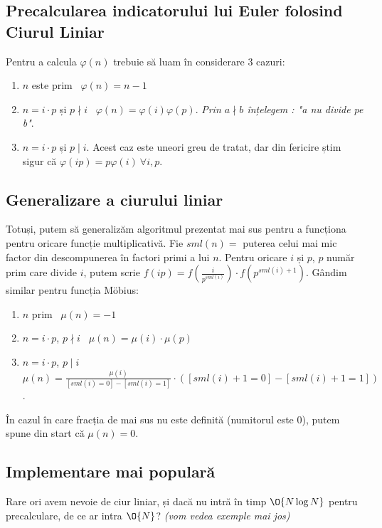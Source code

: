 \subsection{Precalcularea indicatorului lui Euler folosind Ciurul Liniar}
Pentru a calcula $\varphi(n)$ trebuie să luam în considerare $3$ cazuri:
\begin{enumerate}
    \item $n$ este prim \Rightarrow~$\varphi(n) = n-1$
    \item $n = i \cdot p$ și $p \nmid i$ \Rightarrow~$\varphi(n) = \varphi(i) \varphi(p)$. \textit{Prin $a \nmid b$ înțelegem : "a nu divide pe b"}.
    \item $n = i \cdot p$ și $p \mid i$. Acest caz este uneori greu de tratat, dar din fericire știm sigur că $\varphi(ip) = p\varphi(i)\ \forall i, p$.
\end{enumerate}
\subsection{Generalizare a ciurului liniar}
Totuși, putem să generalizăm algoritmul prezentat mai sus pentru a funcționa pentru oricare funcție multiplicativă.
Fie $sml(n) = $ puterea celui mai mic factor din descompunerea în factori primi a lui $n$. Pentru oricare $i$ și $p$, $p$ număr prim care divide $i$, putem scrie $f(ip) = f(\frac{i}{p^{sml(i)}}) \cdot f(p^{sml(i) + 1})$.
Gândim similar pentru funcția Möbius: 
\begin{enumerate}
    \item $n$ prim \Rightarrow~$\mu(n) = -1$
    \item $n = i \cdot p$, $p \nmid i$ \Rightarrow~$\mu(n) = \mu(i) \cdot \mu(p)$
    \item $n = i \cdot p$, $p \mid i$ \Rightarrow~$\mu(n) = \frac{\mu(i)}{[sml(i)=0]-[sml(i)=1]} \cdot ([sml(i)+1=0]-[sml(i)+1=1])$.
\end{enumerate}
\begin{observation}
    În cazul în care fracția de mai sus nu este definită (numitorul este $0$), putem spune din start că $\mu(n) = 0$.
\end{observation}

\subsection{Implementare mai populară}
Rare ori avem nevoie de ciur liniar, și dacă nu intră în timp $\O{N \log{N}}$ pentru precalculare, de ce ar intra $\O{N}$? \textit{(vom vedea exemple mai jos)}

